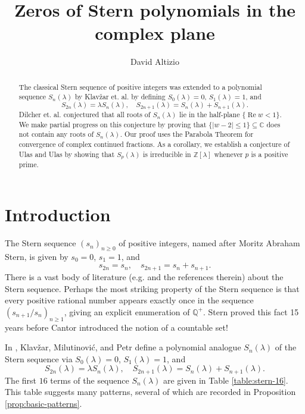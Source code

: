 \documentclass[11pt]{article}
\title{Zeros of Stern polynomials in the complex plane}
\author{David Altizio}
\theoremstyle{definition}
\newcommand{\stern}[2]{S_{#1}(#2)}
\renewcommand{\Re}{\operatorname{Re}}
\newcommand{\lm}{\lambda}
\newcommand{\C}{\mathbb C}
\newcommand{\Z}{\mathbb Z}
\begin{document}
\maketitle

\renewcommand{\baselinestretch}{1.05}
\begin{abstract}
	The classical Stern sequence of positive integers was extended to a polynomial sequence $\stern n\lm$ by Klav\v{z}ar et. al. by defining $\stern 0 \lm = 0$, $\stern 1 \lm = 1$, and 
	\[
	\stern{2n}\lm = \lm \stern n\lm,\quad \stern{2n+1}\lm = \stern n\lm + \stern{n+1}\lm.
	\]
	Dilcher et. al. conjectured that all roots of $\stern n\lm$ lie in the half-plane $\{\Re w < 1\}$.  We make partial progress on this conjecture by proving that $\{|w-2| \leq 1\}\subseteq\C$ does not contain any roots of $\stern n\lm$.  Our proof uses the Parabola Theorem for convergence of complex continued fractions.  As a corollary, we establish a conjecture of Ulas and Ulas by showing that $\stern p\lm$ is irreducible in $\Z[\lm]$ whenever $p$ is a positive prime.
\end{abstract}

\setlength{\parskip}{0pt}
\tableofcontents

\setlength{\parskip}{8pt}
\renewcommand{\baselinestretch}{1.1}

\section{Introduction}

The Stern sequence $(s_n)_{n\geq 0}$ of positive integers, named after Moritz Abraham Stern, is given by $s_0 = 0$, $s_1 = 1$, and 
\begin{equation}\label{eqn:stern-seq}
	s_{2n} = s_n,\quad s_{2n+1} = s_n + s_{n+1}.
\end{equation}
There is a vast body of literature (e.g. \cite{Coons2014,Northshield2010,Reznick2008,Stanley2019} and the references therein) about the Stern sequence.  Perhaps the most striking property of the Stern sequence is that every positive rational number appears exactly once in the sequence $(s_{n+1}/s_n)_{n\geq 1}$, giving an explicit enumeration of $\mathbb Q^+$.  Stern proved this fact 15 years before Cantor introduced the notion of a countable set!

\par In \cite{Klavzar2007}, Klav\v{z}ar, Milutinovi\'{c}, and Petr define a polynomial analogue $\stern n\lm$ of the Stern sequence via $\stern 0\lm = 0$, $\stern 1\lm = 1$, and 
\begin{equation}\label{eqn:stern-def}
	\stern{2n}\lm = \lm \stern n\lm,\quad \stern{2n+1}\lm = \stern n\lm + \stern{n+1}\lm.
\end{equation}
The first $16$ terms of the sequence $\stern n\lm$ are given in Table \ref{table:stern-16}.  This table suggests many patterns, several of which are recorded in Proposition \ref{prop:basic-patterns}.
\end{document}
